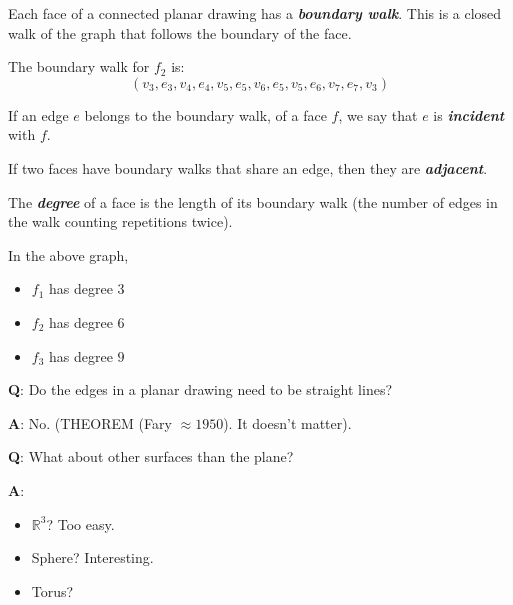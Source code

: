 Each face of a connected planar drawing has a \textbf{\emph{boundary walk}}.
This is a closed walk of the graph that follows the boundary of the face.

The boundary walk for $ f_2 $ is:
\[ (v_3,e_3,v_4,e_4,v_5,e_5,v_6,e_5,v_5,e_6,v_7,e_7,v_3) \]

\begin{defbox}
    \begin{definition}
        If an edge $ e $ belongs to the boundary walk, of a face $ f $,
        we say that $ e $ is \textbf{\emph{incident}} with $ f $.
    \end{definition}
\end{defbox}

\begin{defbox}
    \begin{definition}
        If two faces have boundary walks that share an edge,
        then they are \textbf{\emph{adjacent}}.
    \end{definition}
\end{defbox}

\begin{defbox}
    \begin{definition}
        The \textbf{\emph{degree}} of a face is the length of its
        boundary walk (the number of edges in the walk counting repetitions
        twice).
    \end{definition}
\end{defbox}

\begin{exbox}
    \begin{example}[Degree]
        In the above graph,
        \begin{itemize}
            \item $ f_1 $ has degree $ 3 $
            \item $ f_2 $ has degree $ 6 $
            \item $ f_3 $ has degree $ 9 $
        \end{itemize}
    \end{example}
\end{exbox}

\textbf{Q}: Do the edges in a planar drawing need to be straight
lines?

\textbf{A}: No. (THEOREM (Fary $ \approx 1950 $). It doesn't matter).

\textbf{Q}: What about other surfaces than the plane?

\textbf{A}:
\begin{itemize}
    \item $ \mathbb{R}^3 $? Too easy.
    \item Sphere? Interesting.
    \item Torus?
\end{itemize}

